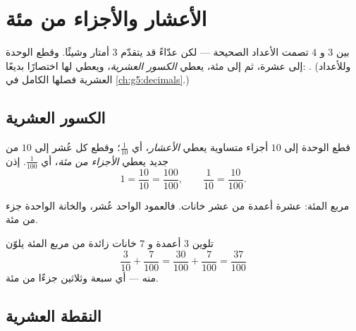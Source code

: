 \chapter{الأعشار والأجزاء من مئة}\label{ch:g4:decimals}

بين $3$ و $4$ تصمت الأعداد الصحيحة --- لكن عدّاءً قد يتقدّم
$3$ أمتار وشيئًا. وقطع الوحدة إلى عشرة، ثم إلى مئة، يعطي
\emph{الكسور العشرية}، ويعطي لها اختصارًا بديعًا: . (وللأعداد العشرية فصلها الكامل في
\cref{ch:g5:decimals}.)

\section{الكسور العشرية}

\begin{definition}\label{def:g4:decimals:def}
قطع الوحدة إلى $10$ أجزاء متساوية يعطي \emph{الأعشار}،
أي $\frac{1}{10}$؛ وقطع كل عُشر إلى $10$ من جديد يعطي
\emph{الأجزاء من مئة}، أي $\frac{1}{100}$. إذن
\[
1 = \frac{10}{10} = \frac{100}{100},
\qquad
\frac{1}{10} = \frac{10}{100}.
\]
\end{definition}

\begin{omfigure}

{\small مربع المئة: عشرة أعمدة من عشر خانات. فالعمود الواحد
عُشر، والخانة الواحدة جزء من مئة.}
\end{omfigure}

\begin{example}\label{ex:g4:decimals:count}
تلوين $3$ أعمدة و $7$ خانات زائدة من مربع المئة يلوّن
\[
\frac{3}{10} + \frac{7}{100} = \frac{30}{100} + \frac{7}{100}
= \frac{37}{100}
\]
منه --- أي سبعة وثلاثين جزءًا من مئة.
\end{example}

\section{النقطة العشرية}

